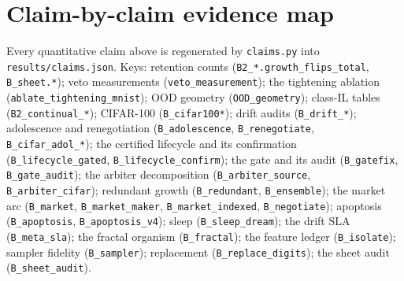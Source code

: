 \documentclass{article}
\begin{document}
\section{Claim-by-claim evidence map}\label{app:claims}
Every quantitative claim above is regenerated by \texttt{claims.py} into
\texttt{results/claims.json}. Keys: retention counts
(\texttt{B2\_*.growth\_flips\_total}, \texttt{B\_sheet.*}); veto measurements
(\texttt{veto\_measurement}); the tightening ablation
(\texttt{ablate\_tightening\_mnist}); OOD geometry (\texttt{OOD\_geometry});
class-IL tables (\texttt{B2\_continual\_*}); CIFAR-100
(\texttt{B\_cifar100*}); drift audits (\texttt{B\_drift\_*}); adolescence and
renegotiation (\texttt{B\_adolescence}, \texttt{B\_renegotiate},
\texttt{B\_cifar\_adol\_*}); the certified lifecycle and its confirmation
(\texttt{B\_lifecycle\_gated}, \texttt{B\_lifecycle\_confirm}); the gate and
its audit (\texttt{B\_gatefix}, \texttt{B\_gate\_audit}); the arbiter
decomposition (\texttt{B\_arbiter\_source}, \texttt{B\_arbiter\_cifar});
redundant growth (\texttt{B\_redundant}, \texttt{B\_ensemble}); the market
arc (\texttt{B\_market}, \texttt{B\_market\_maker}, \texttt{B\_market\_indexed},
\texttt{B\_negotiate}); apoptosis (\texttt{B\_apoptosis},
\texttt{B\_apoptosis\_v4}); sleep (\texttt{B\_sleep\_dream}); the drift SLA
(\texttt{B\_meta\_sla}); the fractal organism (\texttt{B\_fractal}); the
feature ledger (\texttt{B\_isolate}); sampler fidelity (\texttt{B\_sampler});
replacement (\texttt{B\_replace\_digits}); the sheet audit
(\texttt{B\_sheet\_audit}).
\end{document}
